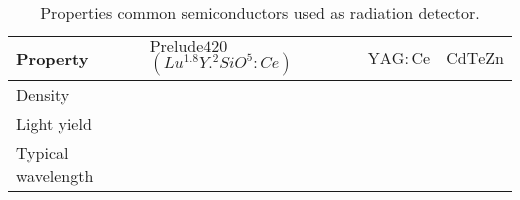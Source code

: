 \begin{table}[ht]
	\centering
	\caption[]{Properties common semiconductors used as radiation detector.}
	\label{chap3:semiconductor}
	\begin{tabular}{llll}
    \toprule
    Property & $\mathrm{Prelude}420$ $(Lu^{1.8}Y.^{2}SiO^{5}:Ce)$ & $\mathrm{YAG:Ce}$ & $\mathrm{CdTeZn}$ \\
    \midrule
    Density &  &  &  \\
    Light yield &  &  &  \\
    Typical wavelength &  & & \\
		\bottomrule
	\end{tabular}
\end{table}